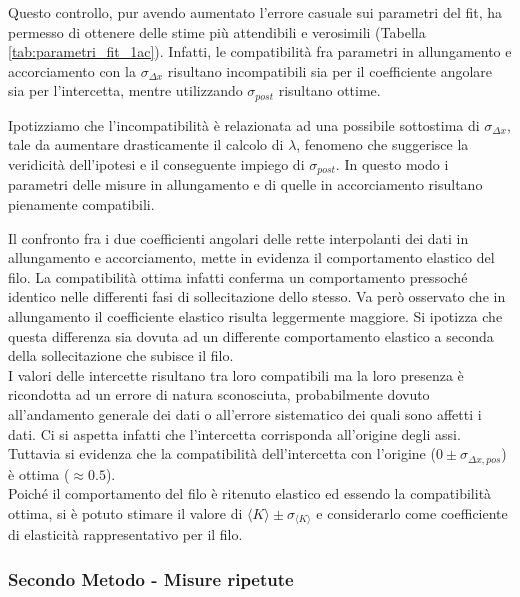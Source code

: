 \documentclass[a4paper,11pt,oneside]{article}
\begin{document}
Questo controllo, pur avendo aumentato l'errore casuale sui parametri del fit, ha permesso di ottenere delle stime più attendibili e verosimili (Tabella \ref{tab:parametri_fit_1ac}). Infatti, le compatibilità fra parametri in allungamento e accorciamento con la $\sigma_{\Delta x}$ risultano incompatibili sia per il coefficiente angolare sia per l'intercetta, mentre utilizzando $\sigma_{post}$ risultano ottime.

Ipotizziamo che l'incompatibilità è relazionata ad una possibile sottostima di $\sigma_{\Delta x}$, tale da aumentare drasticamente il calcolo di $\lambda$, fenomeno che suggerisce la veridicità dell'ipotesi e il conseguente impiego di $\sigma_{post}$. In questo modo i parametri delle misure in allungamento e di quelle in accorciamento risultano pienamente compatibili.

Il confronto fra i due coefficienti angolari delle rette interpolanti dei dati in allungamento e accorciamento, mette in evidenza il comportamento elastico del filo. La compatibilità ottima infatti conferma un comportamento pressoché identico nelle differenti fasi di sollecitazione dello stesso. Va però osservato che in allungamento il coefficiente elastico risulta leggermente maggiore. Si ipotizza che questa differenza sia dovuta ad un differente comportamento elastico a seconda della sollecitazione che subisce il filo.\\

I valori delle intercette risultano tra loro compatibili ma la loro presenza è ricondotta ad un errore di natura sconosciuta, probabilmente dovuto all'andamento generale dei dati o all'errore sistematico dei quali sono affetti i dati. Ci si aspetta infatti che l'intercetta corrisponda all'origine degli assi. Tuttavia si evidenza che la compatibilità dell'intercetta con l'origine ($0\pm \sigma_{\Delta x, pos}$) è ottima ($\approx \num{0.5}$).\\

Poiché il comportamento del filo è ritenuto elastico ed essendo la compatibilità ottima, si è potuto stimare il valore di $\langle K \rangle \pm \sigma_{\langle K \rangle}$ e considerarlo come coefficiente di elasticità rappresentativo per il filo.\\

\subsubsection*{Secondo Metodo - Misure ripetute}
\begin{figure}[h!]
    \centering
\end{figure}
\end{document}
